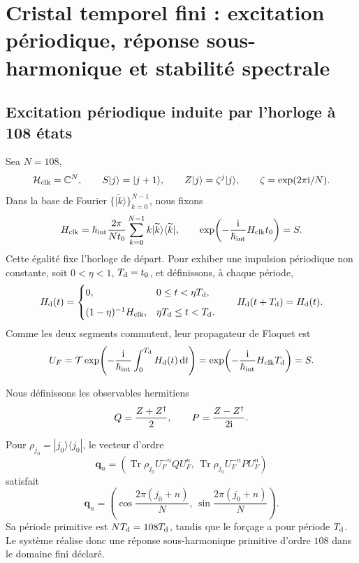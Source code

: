 \section{Cristal temporel fini : excitation périodique, réponse sous-harmonique et stabilité spectrale}
\label{v:sec:hmtf2-cristal-temporal}

\subsection{Excitation périodique induite par l’horloge à 108 états}

Sea \(N=108\),
\[
 \mathcal H_{\rm clk}=\mathbb C^N,\qquad
 S|j\rangle=|j+1\rangle,\qquad
 Z|j\rangle=\zeta^j|j\rangle,\qquad
 \zeta=\exp(2\pi{\rm i}/N).
\]
Dans la base de Fourier \(\{|\widetilde k\rangle\}_{k=0}^{N-1}\), nous fixons
\[
 H_{\rm clk}
 =\hbar_{\rm int}\frac{2\pi}{Nt_0}
 \sum_{k=0}^{N-1}k|\widetilde k\rangle\langle\widetilde k|,
 \qquad
 \exp\!\left(-\frac{{\rm i}}{\hbar_{\rm int}}H_{\rm clk}t_0\right)=S.
\]
Cette égalité fixe l’horloge de départ. Pour exhiber une impulsion périodique non
constante, soit \(0<\eta<1\), \(T_{\rm d}=t_0\), et
définissons, à chaque période,
\[
 H_{\rm d}(t)=
 \begin{cases}
  0,&0\leq t<\eta T_{\rm d},\\[2mm]
  (1-\eta)^{-1}H_{\rm clk},
  &\eta T_{\rm d}\leq t<T_{\rm d}.
 \end{cases}
 \qquad H_{\rm d}(t+T_{\rm d})=H_{\rm d}(t).
\]
Comme les deux segments commutent, leur propagateur de Floquet est
\[
 U_F
 =\mathcal T\exp\!\left(
 -\frac{{\rm i}}{\hbar_{\rm int}}\int_0^{T_{\rm d}}H_{\rm d}(t)\,\mathrm dt
 \right)
 =\exp\!\left(-\frac{{\rm i}}{\hbar_{\rm int}}H_{\rm clk}T_{\rm d}\right)
 =S.
\]

Nous définissons les observables hermitiens
\[
 Q=\frac{Z+Z^\dagger}{2},
 \qquad
 P=\frac{Z-Z^\dagger}{2{\rm i}}.
\]

\begin{theorem}
\label{v:thm:hmtf2-subarmonia-108}
Pour \(\rho_{j_0}=|j_0\rangle\langle j_0|\), le vecteur d’ordre
\[
 \mathbf q_n
 =\left(
 \operatorname{Tr}\rho_{j_0}U_F^{-n}QU_F^n,\,
 \operatorname{Tr}\rho_{j_0}U_F^{-n}PU_F^n
 \right)
\]
satisfait
\[
 \mathbf q_n
 =\left(
 \cos\frac{2\pi(j_0+n)}N,\,
 \sin\frac{2\pi(j_0+n)}N
 \right).
\]
Sa période primitive est \(N T_{\rm d}=108T_{\rm d}\), tandis que le forçage
a pour période \(T_{\rm d}\). Le système réalise donc une réponse
sous-harmonique primitive d’ordre \(108\) dans le domaine fini déclaré.
\end{theorem}

